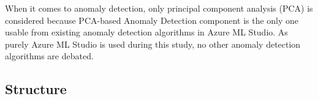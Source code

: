 When it comes to anomaly detection,
only principal component analysis (PCA)
is considered because
PCA-based Anomaly Detection component is the only one usable
from existing anomaly detection algorithms
in Azure ML Studio.
As purely Azure ML Studio is used during this study,
no other anomaly detection algorithms are debated.



\subsection{Structure}\label{subsec:intro-structure}


\clearpage


